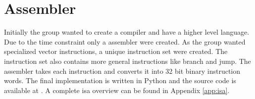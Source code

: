 \section{Assembler}
Initially the group wanted to create a compiler and have a higher level language.
Due to the time constraint only a assembler were created.
As the group wanted specialized vector instructions, a unique instruction set were created.
The instruction set also contains more general instructions like branch and jump.
The assembler takes each instruction and converts it into 32 bit binary instruction words.
The final implementation is written in Python and the source code is available at \cite{assembler}.
A complete \gls{isa} overview can be found in Appendix \ref{app:isa}.
